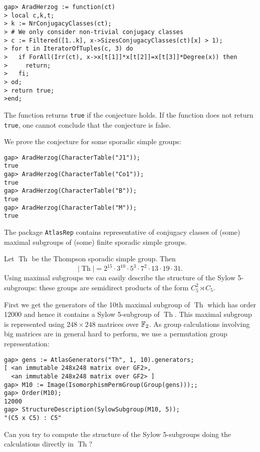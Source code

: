\begin{example}
\begin{lstlisting}
gap> AradHerzog := function(ct)
> local c,k,t;
> k := NrConjugacyClasses(ct);
> # We only consider non-trivial conjugacy classes
> c := Filtered([1..k], x->SizesConjugacyClasses(ct)[x] > 1);
> for t in IteratorOfTuples(c, 3) do
>   if ForAll(Irr(ct), x->x[t[1]]*x[t[2]]=x[t[3]]*Degree(x)) then
>     return;
>   fi;
> od;
> return true;
>end;
\end{lstlisting}
The function returns \lstinline{true} if the conjecture holds. 
If the function does not return \lstinline{true}, 
one cannot conclude that the conjecture is false. 

We prove the conjecture for some sporadic simple groups:
\begin{lstlisting}
gap> AradHerzog(CharacterTable("J1"));
true
gap> AradHerzog(CharacterTable("Co1"));
true
gap> AradHerzog(CharacterTable("B"));
true
gap> AradHerzog(CharacterTable("M"));
true
\end{lstlisting}
\end{example}

The package \lstinline{AtlasRep} contains representative
of conjugacy classes of (some) maximal subgroups of (some)
finite sporadic simple groups. 

\begin{example}
    Let $\operatorname{Th}$ be the Thompson sporadic simple group. 
    Then 
    \[
    |\operatorname{Th}|= 2^{15}\cdot 3^{10}\cdot 5^3\cdot 7^2\cdot 13\cdot 19\cdot 31.
    \]
    Using maximal subgroups 
    we can easily describe 
    the structure of the Sylow 5-subgroups: these 
    groups are semidirect products  
    of the form $C_5^2\rtimes C_5$. 
    
    First we get the
    generators of the 10th maximal subgroup of $\operatorname{Th}$
    which has order 12000 and hence it contains 
    a Sylow 5-subgroup of $\operatorname{Th}$. 
    This maximal subgroup is represented using 
    $248\times248$ matrices over $\mathbb{F}_2$. As
    group calculations
    involving big matrices are in general hard to perform, 
    we use 
    a permutation group representation: 
\begin{lstlisting}
gap> gens := AtlasGenerators("Th", 1, 10).generators;
[ <an immutable 248x248 matrix over GF2>,
  <an immutable 248x248 matrix over GF2> ]
gap> M10 := Image(IsomorphismPermGroup(Group(gens)));;
gap> Order(M10);
12000
gap> StructureDescription(SylowSubgroup(M10, 5));
"(C5 x C5) : C5"
\end{lstlisting}
Can you try to compute the structure of the Sylow 5-subgroups
doing the calculations directly in $\operatorname{Th}$?
\end{example}

